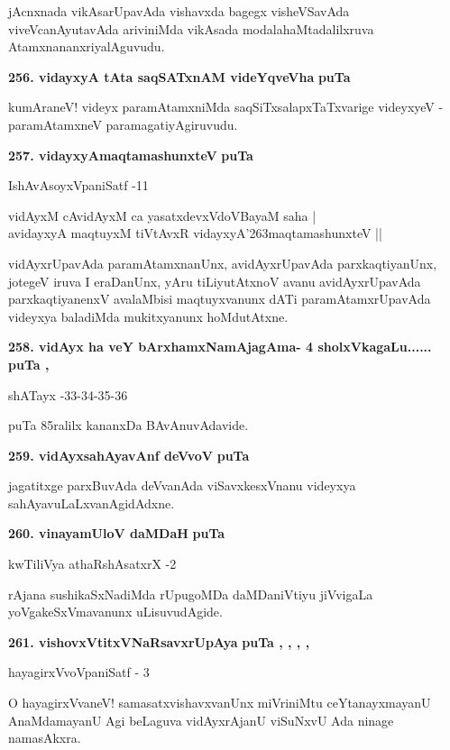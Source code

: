 \smallskip
jAcnxnada vikAsarUpavAda vishavxda bagegx visheVSavAda viveVcanAyutavAda ariviniMda vikAsada modalahaMtadalilxruva AtamxnananxriyalAguvudu.

\medskip
\noindent
\textbf{256. vidayxyA tAta saqSATxnAM videYqveVha} \hfill{\bf puTa }

\smallskip
kumAraneV! videyx paramAtamxniMda saqSiTxsalapxTaTxvarige videyxyeV - paramAtamxneV paramagatiyAgiruvudu.

\medskip
\noindent
\textbf{257. vidayxyAmaqtamashunxteV} \hfill{\bf puTa }

\hfill{IshAvAsoyxVpaniSatf -11}

\begin{shloka}
vidAyxM cAvidAyxM ca yasatxdevxVdoVBayaM saha |\\
avidayxyA maqtuyxM tiVtAvxR vidayxyA\char'263maqtamashunxteV ||
\end{shloka}

\smallskip
vidAyxrUpavAda paramAtamxnanUnx, avidAyxrUpavAda parxkaqtiyanUnx, jotegeV iruva I eraDanUnx, yAru tiLiyutAtxnoV avanu avidAyxrUpavAda parxkaqtiyanenxV avalaMbisi maqtuyxvanunx dATi paramAtamxrUpavAda videyxya baladiMda mukitxyanunx hoMdutAtxne.

\medskip
\noindent
\textbf{258. vidAyx ha veY bArxhamxNamAjagAma- 4 sholxVkagaLu......} \hfill{\bf puTa , }

\hfill{shATayx -33-34-35-36}

\smallskip
puTa 85ralilx kananxDa BAvAnuvAdavide.

\medskip
\noindent
\textbf{259. vidAyxsahAyavAnf deVvoV} \hfill{\bf puTa }

\smallskip
jagatitxge parxBuvAda deVvanAda viSavxkesxVnanu videyxya sahAyavuLaLxvanAgidAdxne.

\medskip
\noindent
\textbf{260. vinayamUloV daMDaH} \hfill{\bf puTa }

\hfill{kwTiliVya athaRshAsatxrX -2}

\smallskip
rAjana sushikaSxNadiMda rUpugoMDa daMDaniVtiyu jiVvigaLa yoVgakeSxVmavanunx uLisuvudAgide.

\medskip
\noindent
\textbf{261. vishovxVtitxVNaRsavxrUpAya} \hfill{\bf puTa , , , , }

\hfill{hayagirxVvoVpaniSatf - 3}

\smallskip
O hayagirxVvaneV! samasatxvishavxvanUnx miVriniMtu ceYtanayxmayanU AnaMdamayanU Agi beLaguva vidAyxrAjanU viSuNxvU Ada ninage namasAkxra.

